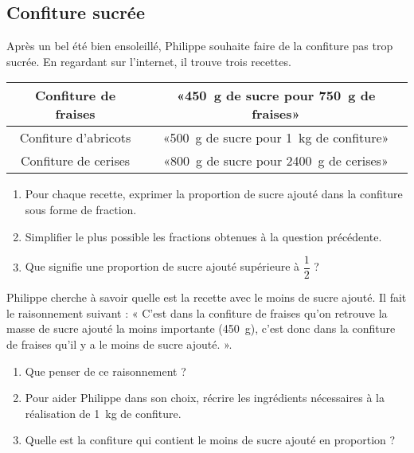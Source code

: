 
\subsection*{Confiture sucrée}

Après un bel été bien ensoleillé, Philippe souhaite faire de la confiture pas trop sucrée. En regardant sur l'internet, il trouve trois recettes.

\begin{center}
    \begin{tabular}[]{|c|c|}
        \hline
        Confiture de fraises&«\SI{450}{\gram} de sucre pour \SI{750}{\gram} de fraises» \\
        \hline
        Confiture d'abricots& «\SI{500}{\gram} de sucre pour \SI{1}{\kilo\gram} de confiture» \\
        \hline
        Confiture de cerises&  «\SI{800}{\gram} de sucre pour \SI{2400}{\gram} de cerises» \\ 
        \hline
    \end{tabular}
\end{center}

\begin{enumerate}
    \item
Pour chaque recette, exprimer la proportion de sucre ajouté dans la confiture sous forme de fraction.
\item
    Simplifier le plus possible les fractions obtenues à la question précédente.
\item
    Que signifie une proportion de sucre ajouté supérieure à \( \dfrac{ 1 }{ 2 }\) ?
\end{enumerate}

Philippe cherche à savoir quelle est la recette avec le moins de sucre ajouté. Il fait le raisonnement suivant : « C'est dans la confiture de fraises qu'on retrouve la masse de sucre ajouté la moins importante (\SI{450}{\gram}), c'est donc dans la confiture de fraises qu'il y a le moins de sucre ajouté. ». 

\begin{enumerate}
    \item
Que penser de ce raisonnement ?
\item
Pour aider Philippe dans son choix, récrire les ingrédients nécessaires à la réalisation de \SI{1}{\kilo\gram} de confiture.
\item
Quelle est la confiture qui contient le moins de sucre ajouté en proportion ?
\end{enumerate}

